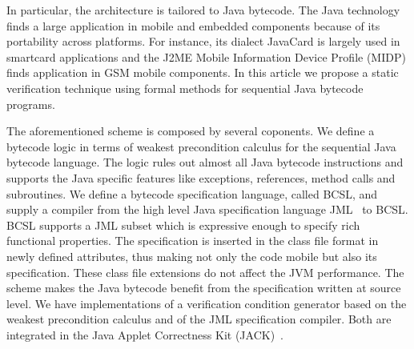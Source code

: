 In particular, the architecture is tailored to Java bytecode. %
The Java technology finds a large application in mobile and embedded components because of its portability across platforms. 
For instance, its dialect JavaCard is largely used in smartcard applications and the J2ME Mobile Information Device Profile (MIDP) finds application in GSM mobile components. 
In this article we propose a static verification technique using formal methods for sequential Java bytecode programs.

The aforementioned scheme is composed by several coponents.
We define a bytecode logic in terms of weakest precondition calculus for the sequential Java bytecode language. The logic rules out 
almost all Java bytecode instructions and supports the Java specific features like 
exceptions, references, method calls and subroutines.  
 We define a bytecode specification language, called BCSL, and supply a compiler from 
 the high level Java specification language JML~\cite{JMLRefMan} to BCSL. 
 BCSL supports a JML subset which is expressive enough to specify rich functional properties. The specification is 
 inserted in the class file format in newly defined attributes, thus making not only the code mobile but also its specification. These class
 file extensions do not affect the JVM performance. The scheme makes the Java bytecode benefit from the specification written at source level.
 We have implementations of a verification condition generator based on the weakest precondition calculus and of the JML specification compiler. Both are integrated in the Java Applet Correctness Kit (JACK)~\cite{BRL-JACK}. 


